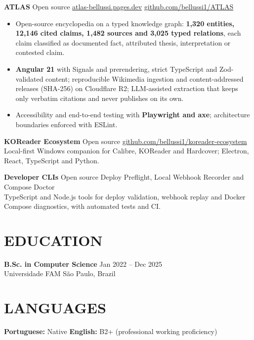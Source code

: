 ﻿\documentclass[10pt,a4paper]{article}
\begin{document}
\textbf{ATLAS} \textbar{} Open source \textbar{} \href{https://atlas-bellussi.pages.dev/}{atlas-bellussi.pages.dev} \textbar{} \href{https://github.com/bellussi1/ATLAS}{github.com/bellussi1/ATLAS}
\begin{itemize}
  \item Open-source encyclopedia on a typed knowledge graph: \textbf{1,320 entities, 12,146 cited claims, 1,482 sources and 3,025 typed relations}, each claim classified as documented fact, attributed thesis, interpretation or contested claim.
  \item \textbf{Angular 21} with Signals and prerendering, strict TypeScript and Zod-validated content; reproducible Wikimedia ingestion and content-addressed releases (SHA-256) on Cloudflare R2; LLM-assisted extraction that keeps only verbatim citations and never publishes on its own.
  \item Accessibility and end-to-end testing with \textbf{Playwright and axe}; architecture boundaries enforced with ESLint.
\end{itemize}

\textbf{KOReader Ecosystem} \textbar{} Open source \textbar{} \href{https://github.com/bellussi1/koreader-ecosystem}{github.com/bellussi1/koreader-ecosystem}\\
Local-first Windows companion for Calibre, KOReader and Hardcover; Electron, React, TypeScript and Python.

\textbf{Developer CLIs} \textbar{} Open source \textbar{} Deploy Preflight, Local Webhook Recorder and Compose Doctor\\
TypeScript and Node.js tools for deploy validation, webhook replay and Docker Compose diagnostics, with automated tests and CI.

\section*{EDUCATION}
\textbf{B.Sc. in Computer Science} \hfill Jan 2022 -- Dec 2025\\
Universidade FAM \hfill S\~ao Paulo, Brazil

\section*{LANGUAGES}
\textbf{Portuguese:} Native \hfill \textbf{English:} B2+ (professional working proficiency)
\end{document}
